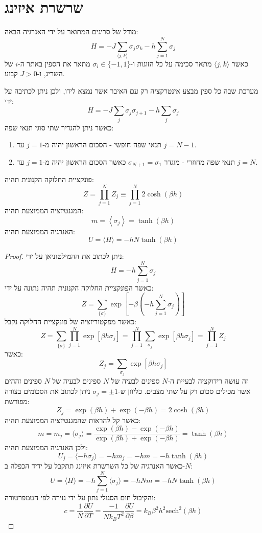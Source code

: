 \documentclass{tstextbook}
\begin{document}
\section{שרשרת איזינג}

\begin{reminder}
מודל של סריגים המתואר על ידי האנרגיה הבאה:
$$H=-J\sum_{\langle j,k\rangle}\sigma_{j}\sigma_{k}-h\sum_{j=1}^{N}\sigma_{j}$$
כאשר \(\langle j,k \rangle\) מתאר סכימה על כל הזוגות ו-\(\sigma_{i}\in\{ -1,1 \}\) מתאר את הספין באתר ה-\(i\) של השריג, ו-\(J>0\) קבוע.

\end{reminder}
\begin{definition}
מערכת שבה כל ספין מבצע אינטרקציה רק עם האיבר אשר נמצא לידו, ולכן ניתן לכתיבה על ידי:
$$H=-J\sum_{j}\sigma_{j}\sigma_{j+1}-h\sum_{j}\sigma_{j}$$
כאשר ניתן להגדיר שתי סוגי תנאי שפה:

  \begin{enumerate}
    \item תנאי שפה חופשי - הסכום הראשון יהיה מ-\(j=1\) עד \(j=N-1\). 


    \item תנאי שפה מחוזרי - מוגדר \(\sigma_{N+1}=\sigma_{1}\) כאשר הסכום הראשון יהיה מ-\(j=1\) עד \(j=N\). 


  \end{enumerate}
\end{definition}
\begin{proposition}[שרשרת איזינג כאשר \(J=0\)]
פונקציית החלוקה הקנונית תהיה:
$$Z=\prod_{j=1}^{N} Z_{j}\equiv \prod_{j=1}^{N}2\cosh\left( \beta h \right)$$
המגנטיזציה הממוצעת תהיה:
$$m=\left\langle  \sigma_{j}  \right\rangle =\tanh\left( \beta h \right)$$
האנרגיה הממוצעת תהיה:
$$U=\langle H\rangle=-h N\operatorname{tanh}(\beta h)$$

\end{proposition}
\begin{proof}
ניתן לכתוב את ההמילטוניאן על ידי:
$$H=-h\sum_{j=1}^{N}\sigma_{j}$$
כאשר הפונקציית החלוקה הקנונית תהיה נתונה על ידי:
$$Z=\sum_{\{\sigma\}}\exp[-\beta(-h\sum_{j=1}^{N}\sigma_{j})]$$
כאשר מפקטוריזציה של פונקציית החלוקה נקבל:
$$Z=\sum_{\{\sigma\}}\prod_{j=1}^{N}\exp[\beta h\sigma_{j}]=\prod_{j=1}^{N}\sum_{\sigma_{j}}\exp[\beta h\sigma_{j}]=\prod_{j=1}^{N}Z_{j}$$
כאשר:
$$Z_{j}=\sum_{\sigma_{j}}\exp[\beta h\sigma_{j}]$$
זה עושה רידוקציה לבעיית ה-\(N\) ספינים לבעיה של \(N\) ספינים לבעיה של \(N\) ספינים זההים אשר מכילים סכום רק על שתי מצבים. כליוון ש-\(\sigma_{j}=\pm 1\) ניתן לכתוב את הסכומים בצורה מפורשת:
$$Z_{j}=\exp(\beta h)+\exp(-\beta h)=2\cosh(\beta h)$$
כאשר קל להראות שהמגנטיזציה הממוצעת תהיה:
$$m=m_{j}=\langle\sigma_{j}\rangle={\frac{\exp(\beta h)-\exp(-\beta h)}{\exp(\beta h)+\exp(-\beta h)}}=\operatorname{tanh}(\beta h)$$
ולכן האנרגיה הממוצעת תהיה:
$$U_{j}=\langle-h\sigma_{j}\rangle=-h m_{j}=-h m=-h\operatorname{tanh}(\beta h)$$
כאשר האנרגיה של כל השרשרת איזינג תתקבל על ידיד הכפלה ב-\(N\):
$$U=\langle H\rangle=-h\sum_{j=1}^{N}\langle\sigma_{j}\rangle=-h N m=-h N\operatorname{tanh}(\beta h)$$
והקיבול חום הסגולי נתון על ידי גזירה לפי הטמפרטורה:
$$c=\frac{1}{N}\frac{\partial U}{\partial T}=\frac{-1}{N k_{B}T^{2}}\frac{\partial U}{\partial\beta}=k_{B}\beta^{2}h^{2}\mathrm{sech}^{2}(\beta h)$$

\end{proof}
\end{document}
